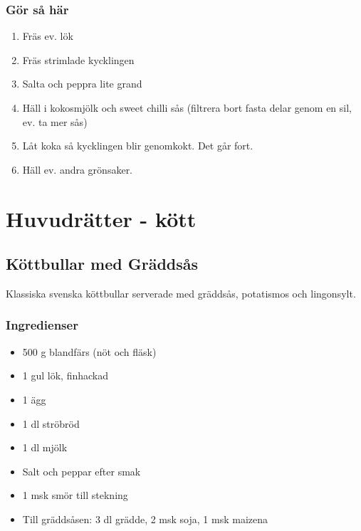 \documentclass[a4paper,11pt,twocolumn]{article}
\begin{document}
\subsubsection*{Gör så här}
\begin{enumerate}[label=\arabic*.]
    \item Fräs ev. lök
    \item Fräs strimlade kycklingen
    \item Salta och peppra lite grand
    \item Häll i kokosmjölk och sweet chilli sås (filtrera bort fasta delar genom en sil, ev. ta mer sås)
    \item Låt koka så kycklingen blir genomkokt. Det går fort.
    \item Häll ev. andra grönsaker.
\end{enumerate}





\newpage
\section{Huvudrätter - kött}

\subsection{Köttbullar med Gräddsås}

Klassiska svenska köttbullar serverade med gräddsås, potatismos och lingonsylt.

\subsubsection*{Ingredienser}
\begin{itemize}[noitemsep]
    \item 500 g blandfärs (nöt och fläsk)
    \item 1 gul lök, finhackad
    \item 1 ägg
    \item 1 dl ströbröd
    \item 1 dl mjölk
    \item Salt och peppar efter smak
    \item 1 msk smör till stekning
    \item Till gräddsåsen: 3 dl grädde, 2 msk soja, 1 msk maizena
\end{itemize}
\end{document}
